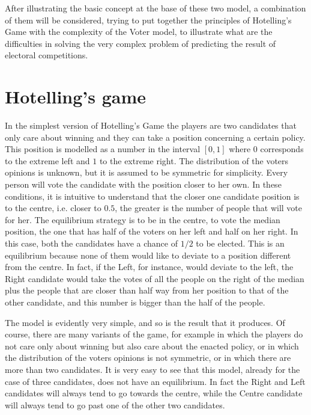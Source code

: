 \documentclass[11pt,a4paper,twocolumn]{article}
\begin{document}
After illustrating the basic concept at the base of these two model, a combination of them will be considered, trying to put together the principles of Hotelling's Game with the complexity of the Voter model, to illustrate what are the difficulties in solving the very complex problem of predicting the result of electoral competitions.

\section{Hotelling's game}
\vspace*{-0.2cm}

In the simplest version of Hotelling's Game the players are two candidates that only care about winning and they can take a position concerning a certain policy. This position is modelled as a number in the interval $[0,1]$ where $0$ corresponds to the extreme left and $1$ to the extreme right. The distribution of the voters opinions is unknown, but it is assumed to be symmetric for simplicity. Every person will vote the candidate with the position closer to her own. In these conditions, it is intuitive to understand that the closer one candidate position is to the centre, i.e. closer to $0.5$, the greater is the number of people that will vote for her. 
The equilibrium strategy is to be in the centre, to vote the median position, the one that has half of the voters on her left and half on her right. 
In this case, both the candidates have a chance of $1/2$ to be elected. This is an equilibrium because none of them would like to deviate to a position different from the centre. In fact, if the Left, for instance, would deviate to the left, the Right candidate would take the votes of all the people on the right of the median plus the people that are closer than half way from her position to that of the other candidate, and this number is bigger than the half of the people.

The model is evidently very simple, and so is the result that it produces. Of course, there are many variants of the game, for example in which the players do not care only about winning but also care about the enacted policy, or in which the distribution of the voters opinions is not symmetric, or in which there are more than two candidates. It is very easy to see that this model, already for the case of three candidates, does not have an equilibrium. In fact the Right and Left candidates will always tend to go towards the centre, while the Centre candidate will always tend to go past one of the other two candidates.
\end{document}
